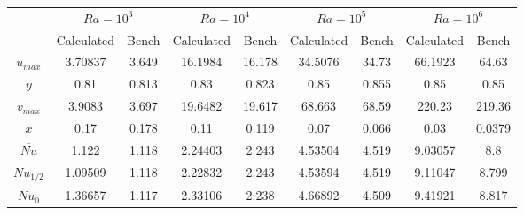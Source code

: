 \begin{table}[h]
	\centering
	\begin{tabular}{c|c|c|c|c|c|c|c|c|}
		\cline{2-9}
		\multicolumn{1}{l|}{}       & \multicolumn{2}{c|}{$Ra=10^{3}$} & \multicolumn{2}{c|}{$Ra=10^{4}$} & \multicolumn{2}{c|}{$Ra=10^{5}$} & \multicolumn{2}{c|}{$Ra=10^{6}$} \\ \cline{2-9} 
		\multicolumn{1}{l|}{}       & Calculated                & Bench                & Calculated                & Bench                & Calculated                & Bench                & Calculated                & Bench                \\ \hline
		\multicolumn{1}{|c|}{$u_{max}$}  & 3.70837                   & 3.649                & 16.1984                   & 16.178               & 34.5076                   & 34.73                & 66.1923                   & 64.63                \\ \hline
		\multicolumn{1}{|c|}{$y$}     & 0.81                      & 0.813                & 0.83                      & 0.823                & 0.85                      & 0.855                & 0.85                      & 0.85                 \\ \hline
		\multicolumn{1}{|c|}{$v_{max}$}  & 3.9083                    & 3.697                & 19.6482                   & 19.617               & 68.663                    & 68.59                & 220.23                    & 219.36               \\ \hline
		\multicolumn{1}{|c|}{$x$}     & 0.17                      & 0.178                & 0.11                      & 0.119                & 0.07                      & 0.066                & 0.03                      & 0.0379               \\ \hline
		\multicolumn{1}{|c|}{$\overbar{Nu}$} & 1.122                     & 1.118                & 2.24403                   & 2.243                & 4.53504                   & 4.519                & 9.03057                   & 8.8                  \\ \hline
		\multicolumn{1}{|c|}{$Nu_{1/2}$}  & 1.09509                   & 1.118                & 2.22832                   & 2.243                & 4.53594                   & 4.519                & 9.11047                   & 8.799                \\ \hline
		\multicolumn{1}{|c|}{$Nu_{0}$}   & 1.36657                   & 1.117                & 2.33106                   & 2.238                & 4.66892                   & 4.509                & 9.41921                   & 8.817                \\ \hline

\end{tabular}
\end{table}
